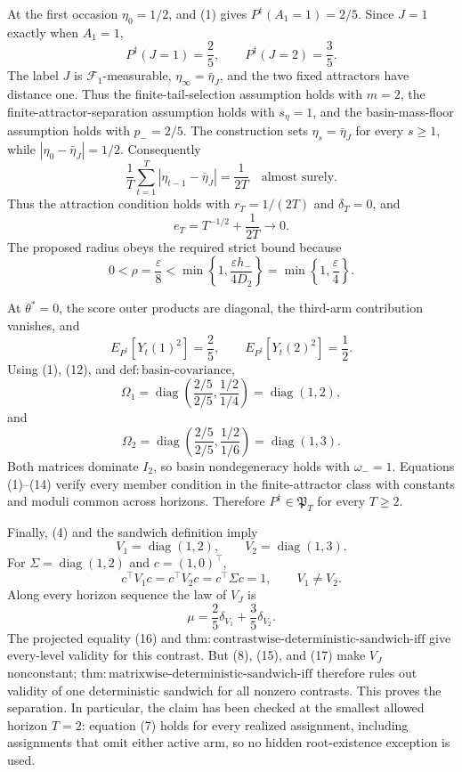 At the first occasion \(\eta_0=1/2\), and (1) gives \(P^{\dagger}(A_1=1)=2/5\). Since \(J=1\) exactly when \(A_1=1\),
\[
 P^{\dagger}(J=1)=\frac25,
 \qquad P^{\dagger}(J=2)=\frac35.
\tag{8}
\]
The label \(J\) is \(\mathcal F_1\)-measurable, \(\eta_\infty=\bar\eta_J\), and the two fixed attractors have distance one. Thus the finite-tail-selection assumption holds with \(m=2\), the finite-attractor-separation assumption holds with \(s_\eta=1\), and the basin-mass-floor assumption holds with \(p_-=2/5\). The construction sets \(\eta_s=\bar\eta_J\) for every \(s\ge1\), while \(|\eta_0-\bar\eta_J|=1/2\). Consequently
\[
 \frac1T\sum_{t=1}^T|\eta_{t-1}-\bar\eta_J|=\frac1{2T}
 \quad\text{almost surely}.
\tag{9}
\]
Thus the attraction condition holds with \(r_T=1/(2T)\) and \(\delta_T=0\), and
\[
 e_T=T^{-1/2}+\frac1{2T}\longrightarrow0.
\tag{10}
\]
The proposed radius obeys the required strict bound because
\[
 0<\rho=\frac\varepsilon8
 <\min\left\{1,\frac{\varepsilon h_-}{4D_2}\right\}
 =\min\left\{1,\frac\varepsilon4\right\}.
\tag{11}
\]

At \(\theta^*=0\), the score outer products are diagonal, the third-arm contribution vanishes, and
\[
 E_{P^{\dagger}}[Y_t(1)^2]=\frac25,
 \qquad E_{P^{\dagger}}[Y_t(2)^2]=\frac12.
\tag{12}
\]
Using (1), (12), and \(\mathrm{def:basin\text{-}covariance}\),
\[
 \Omega_1=\operatorname{diag}\left(\frac{2/5}{2/5},\frac{1/2}{1/4}\right)
 =\operatorname{diag}(1,2),
\tag{13}
\]
and
\[
 \Omega_2=\operatorname{diag}\left(\frac{2/5}{2/5},\frac{1/2}{1/6}\right)
 =\operatorname{diag}(1,3).
\tag{14}
\]
Both matrices dominate \(I_2\), so basin nondegeneracy holds with \(\omega_-=1\). Equations (1)--(14) verify every member condition in the finite-attractor class with constants and moduli common across horizons. Therefore \(P^{\dagger}\in\mathfrak P_T\) for every \(T\ge2\).

Finally, (4) and the sandwich definition imply
\[
 V_1=\operatorname{diag}(1,2),
 \qquad V_2=\operatorname{diag}(1,3).
\tag{15}
\]
For \(\Sigma=\operatorname{diag}(1,2)\) and \(c=(1,0)^\top\),
\[
 c^\top V_1c=c^\top V_2c=c^\top\Sigma c=1,
 \qquad V_1\ne V_2.
\tag{16}
\]
Along every horizon sequence the law of \(V_J\) is
\[
 \mu=\frac25\delta_{V_1}+\frac35\delta_{V_2}.
\tag{17}
\]
The projected equality (16) and \(\mathrm{thm:contrastwise\text{-}deterministic\text{-}sandwich\text{-}iff}\) give every-level validity for this contrast. But (8), (15), and (17) make \(V_J\) nonconstant; \(\mathrm{thm:matrixwise\text{-}deterministic\text{-}sandwich\text{-}iff}\) therefore rules out validity of one deterministic sandwich for all nonzero contrasts. This proves the separation. In particular, the claim has been checked at the smallest allowed horizon \(T=2\): equation (7) holds for every realized assignment, including assignments that omit either active arm, so no hidden root-existence exception is used.